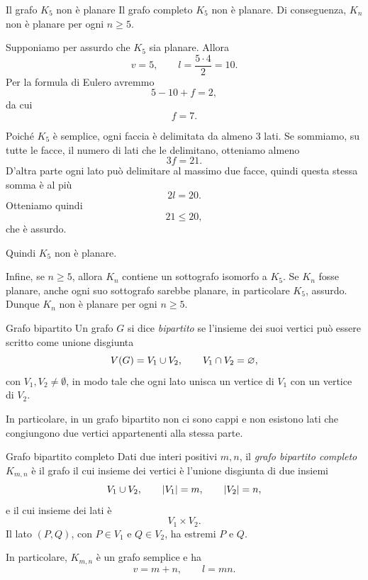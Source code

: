 \documentclass[a4paper]{article}
\begin{document}
\begin{snippetproposition}{Il grafo \(K_5\) non è planare}
    Il grafo completo \(K_5\) non è planare. Di conseguenza, \(K_n\) non è planare per ogni \(n\geq 5\).
\end{snippetproposition}

\begin{snippetproof}{}
    Supponiamo per assurdo che \(K_5\) sia planare. Allora
    \[
        v=5,
        \qquad
        l=\frac{5\cdot 4}{2}=10.
    \]
    Per la formula di Eulero avremmo
    \[
        5-10+f=2,
    \]
    da cui
    \[
        f=7.
    \]

    Poiché \(K_5\) è semplice, ogni faccia è delimitata da almeno \(3\) lati. Se sommiamo, su tutte le facce, il numero di lati che le delimitano, otteniamo almeno
    \[
        3f=21.
    \]
    D'altra parte ogni lato può delimitare al massimo due facce, quindi questa stessa somma è al più
    \[
        2l=20.
    \]
    Otteniamo quindi
    \[
        21\leq 20,
    \]
    che è assurdo.

    Quindi \(K_5\) non è planare.

    Infine, se \(n\geq 5\), allora \(K_n\) contiene un sottografo isomorfo a \(K_5\). Se \(K_n\) fosse planare, anche ogni suo sottografo sarebbe planare, in particolare \(K_5\), assurdo. Dunque \(K_n\) non è planare per ogni \(n\geq 5\).
\end{snippetproof}

\begin{snippetdefinition}{Grafo bipartito}
    Un grafo \(G\) si dice \emph{bipartito} se l'insieme dei suoi vertici può essere scritto come unione disgiunta
    \[
        V(G)=V_1\cup V_2,
        \qquad
        V_1\cap V_2=\varnothing,
    \]
    con \(V_1,V_2\neq\emptyset\), in modo tale che ogni lato unisca un vertice di \(V_1\) con un vertice di \(V_2\).

    In particolare, in un grafo bipartito non ci sono cappi e non esistono lati che congiungono due vertici appartenenti alla stessa parte.
\end{snippetdefinition}

\begin{snippetdefinition}{Grafo bipartito completo}
    Dati due interi positivi \(m,n\), il \emph{grafo bipartito completo} \(K_{m,n}\) è il grafo il cui insieme dei vertici è l'unione disgiunta di due insiemi
    \[
        V_1\cup V_2,
        \qquad
        |V_1|=m,
        \qquad
        |V_2|=n,
    \]
    e il cui insieme dei lati è
    \[
        V_1\times V_2.
    \]
    Il lato \((P,Q)\), con \(P\in V_1\) e \(Q\in V_2\), ha estremi \(P\) e \(Q\).

    In particolare, \(K_{m,n}\) è un grafo semplice e ha
    \[
        v=m+n,
        \qquad
        l=mn.
    \]
\end{snippetdefinition}
\end{document}
